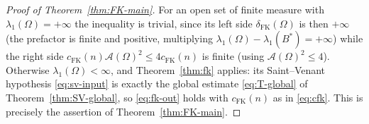 \documentclass[11pt]{amsart}
\theoremstyle{definition}
\newcommand{\Om}{\Omega}
\newcommand{\Fr}{\mathcal A}
\begin{document}
\begin{proof}[Proof of Theorem~\ref{thm:FK-main}]
For an open set of finite measure with $\lambda_1(\Om)=+\infty$ the
inequality is trivial, since its left side $\delta_{\mathrm{FK}}(\Om)$ is
then $+\infty$ (the prefactor is finite and positive, multiplying
$\lambda_1(\Om)-\lambda_1(B^*)=+\infty$) while the right side
$c_{\mathrm{FK}}(n)\Fr(\Om)^2\le 4c_{\mathrm{FK}}(n)$ is finite (using
$\Fr(\Om)^2\le4$). Otherwise $\lambda_1(\Om)<\infty$, and
Theorem~\ref{thm:fk} applies: its Saint--Venant hypothesis
\eqref{eq:sv-input} is exactly the global estimate \eqref{eq:T-global} of
Theorem~\ref{thm:SV-global}, so \eqref{eq:fk-out} holds with
$c_{\mathrm{FK}}(n)$ as in \eqref{eq:cfk}. This is precisely the assertion of
Theorem~\ref{thm:FK-main}.
\end{proof}
\end{document}

